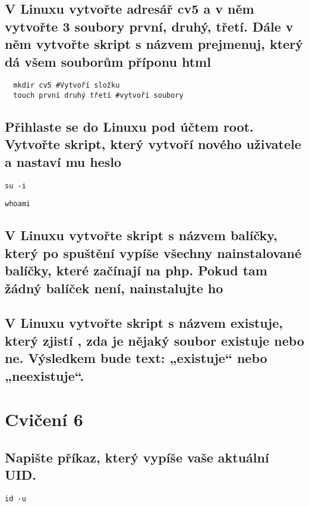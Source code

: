 \documentclass{article}
\begin{document}
\subsection{V Linuxu vytvořte adresář cv5 a v něm vytvořte 3 soubory první, druhý, třetí. Dále v něm vytvořte skript s názvem prejmenuj, který dá všem souborům příponu html}
\begin{lstlisting}
  mkdir cv5 #Vytvoří složku
  touch první druhý třetí #vytvoří soubory
\end{lstlisting}

\subsection{Přihlaste se do Linuxu pod účtem root. Vytvořte skript, který vytvoří nového uživatele a nastaví mu heslo}
\begin{lstlisting}[caption=Přihlasíme se jako root]
  su -i
\end{lstlisting}
\begin{lstlisting}[caption=Můžeme zkontrolovat za koho jsme přihlášení]
  whoami
\end{lstlisting}

\subsection{V Linuxu vytvořte skript s názvem balíčky, který po spuštění vypíše všechny nainstalované balíčky, které začínají na php. Pokud tam žádný balíček není, nainstalujte ho}

\subsection{V Linuxu vytvořte skript s názvem existuje, který zjistí , zda je nějaký soubor existuje nebo ne. Výsledkem bude text: „existuje“ nebo „neexistuje“.}

\section{Cvičení 6}
\subsection{Napište příkaz, který vypíše vaše aktuální UID.}

\begin{lstlisting}
id -u
\end{lstlisting}
\end{document}
